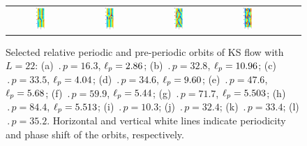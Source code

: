 \begin{figure}[t]
\begin{center}
\begin{tabular}{cccccc}
\includegraphics[width=0.15\textwidth, clip=true]{figs_bmp/ks22rpo059.9-05.44.eps}\hspace{-3ex} &
\includegraphics[width=0.15\textwidth, clip=true]{figs_bmp/ks22rpo084.4-05.51.eps}\hspace{-3ex} &
\includegraphics[width=0.15\textwidth, clip=true]{figs_bmp/ks22rpo064.7-00.00.eps}\hspace{-3ex} &
\includegraphics[width=0.15\textwidth, clip=true]{figs_bmp/ks22rpo070.3-00.00.eps}
\end{tabular}
\end{center}
\caption{Selected relative periodic and
pre-periodic
orbits of KS flow with $L = 22$:
(a) $\period{p} = 16.3$, $\ell_p = 2.86$;
(b) $\period{p} = 32.8$, $\ell_p = 10.96$;
(c) $\period{p} = 33.5$, $\ell_p = 4.04$;
(d) $\period{p} = 34.6$, $\ell_p = 9.60$;
(e) $\period{p} = 47.6$, $\ell_p = 5.68$;
(f) $\period{p} = 59.9$, $\ell_p = 5.44$;
(g) $\period{p} = 71.7$, $\ell_p = 5.503$;
(h) $\period{p} = 84.4$, $\ell_p = 5.513$;
(i) $\period{p} = 10.3$;
(j) $\period{p} = 32.4$;
(k) $\period{p} = 33.4$;
(l) $\period{p} = 35.2$.
Horizontal and vertical white lines indicate periodicity and phase
shift of the orbits, respectively.
}\label{f:ks22rpos}
\end{figure}
